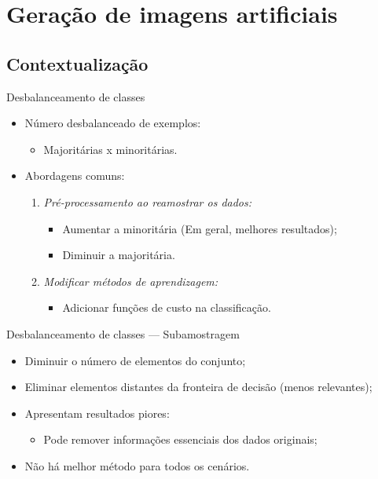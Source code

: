 \documentclass[10pt]{beamer}
\begin{document}
\section{Geração de imagens artificiais}
\subsection{Contextualização}
\begin{frame}{Desbalanceamento de classes}
  \setlength\leftmargini{1em}
  \begin{itemize}
    \item Número desbalanceado de exemplos:
      \begin{itemize}
        \item Majoritárias x minoritárias.
      \end{itemize}
    \item Abordagens comuns:
    \begin{enumerate}
      \item \emph{Pré-processamento ao reamostrar os dados:}
      \begin{itemize}
        \item Aumentar a minoritária (Em geral, melhores resultados);
        \item Diminuir a majoritária.
      \end{itemize}
      \item \emph{Modificar métodos de aprendizagem:}
      \begin{itemize}
        \item Adicionar funções de custo na classificação.
      \end{itemize}
    \end{enumerate}
  \end{itemize}
\end{frame}
\begin{frame}{Desbalanceamento de classes --- Subamostragem}
  \setlength\leftmargini{1em}
    \begin{itemize}
    \item Diminuir o número de elementos do conjunto;
    \item Eliminar elementos distantes da fronteira de decisão (menos relevantes);
    \item Apresentam resultados piores:
    \begin{itemize}
      \item Pode remover informações essenciais dos dados originais;
    \end{itemize}
    \item Não há melhor método para todos os cenários.
  \end{itemize}
\end{frame}
\end{document}
